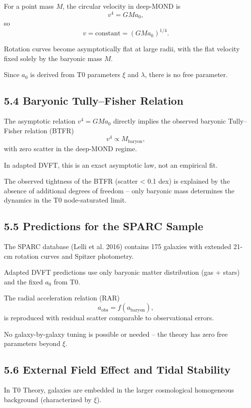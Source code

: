 \documentclass[12pt,a4paper]{article}
\begin{document}
	For a point mass $M$, the circular velocity in deep-MOND is
	\[
	v^4 = G M a_0,
	\]
	so
	\[
	v = \text{constant} = (G M a_0)^{1/4}.
	\]
	
	Rotation curves become asymptotically flat at large radii, with the flat velocity fixed solely by the baryonic mass $M$.
	
	Since $a_0$ is derived from T0 parameters $\xi$ and $\lambda$, there is no free parameter.
	
	\subsection{5.4 Baryonic Tully–Fisher Relation}
	
	The asymptotic relation $v^4 = G M a_0$ directly implies the observed baryonic Tully–Fisher relation (BTFR)
	\[
	v^4 \propto M_{\text{baryon}},
	\]
	with zero scatter in the deep-MOND regime.
	
	In adapted DVFT, this is an exact asymptotic law, not an empirical fit.
	
	The observed tightness of the BTFR (scatter < 0.1 dex) is explained by the absence of additional degrees of freedom – only baryonic mass determines the dynamics in the T0 node-saturated limit.
	
	\subsection{5.5 Predictions for the SPARC Sample}
	
	The SPARC database (Lelli et al. 2016) contains 175 galaxies with extended 21-cm rotation curves and Spitzer photometry.
	
	Adapted DVFT predictions use only baryonic matter distribution (gas + stars) and the fixed $a_0$ from T0.
	
	The radial acceleration relation (RAR)
	\[
	a_{\text{obs}} = f(a_{\text{baryon}}),
	\]
	is reproduced with residual scatter comparable to observational errors.
	
	No galaxy-by-galaxy tuning is possible or needed – the theory has zero free parameters beyond $\xi$.
	
	\subsection{5.6 External Field Effect and Tidal Stability}
	
	In T0 Theory, galaxies are embedded in the larger cosmological homogeneous background (characterized by $\xi$).
	
\end{document}
